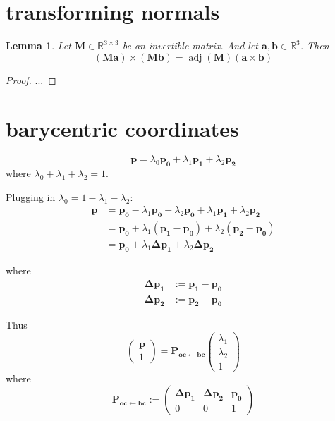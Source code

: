 \documentclass{article}
\newtheorem{lemma}{Lemma}
\newcommand{\R}{\mathbb{R}}
\newcommand{\vctr}[1]{\mathbf{#1}}
\newcommand{\point}[1]{\mathbf{#1}}
\newcommand{\mat}[1]{\mathbf{#1}}
\newcommand{\pMat}[2]{\mat{P_{#1 \leftarrow #2}}}
\newcommand{\colvec}[1]{\begin{pmatrix}#1\end{pmatrix}}
\DeclareMathOperator{\adj}{adj}
\begin{document}
\section{transforming normals}

\begin{lemma}
Let \(\mat{M} \in \R^{3\times 3}\) be an invertible matrix. And let \(\vctr{a}, \vctr{b} \in \R^3\). Then
\[
(\mat{M}\vctr{a})\times(\mat{M}\vctr{b}) = \adj(\mat{M}) (\vctr{a} \times \vctr{b})
\]
\end{lemma}
\begin{proof}
 ...
\end{proof}



\section{barycentric coordinates}

\[
\point{p} = \lambda_0 \point{p_0} + \lambda_1 \point{p_1} + \lambda_2 \point{p_2}
\]
where \(\lambda_0 + \lambda_1 + \lambda_2 = 1\).

Plugging in \(\lambda_0 = 1 - \lambda_1 - \lambda_2\):
\begin{align*}
\point{p} &= \point{p_0} - \lambda_1 \point{p_0} - \lambda_2 \point{p_0}  + \lambda_1 \point{p_1} + \lambda_2 \point{p_2} \\
&= \point{p_0}  + \lambda_1 (\point{p_1}-\point{p_0}) + \lambda_2 (\point{p_2} - \point{p_0})\\
&= \point{p_0} + \lambda_1 \point{\Delta p_1} + \lambda_2 \point{\Delta p_2}
\end{align*}

where
\begin{align*}
\point{\Delta p_1} &:= \point{p_1} - \point{p_0}\\
\point{\Delta p_2} &:= \point{p_2} - \point{p_0}
\end{align*}

Thus
\[
 \colvec{\point{p}\\1} = \pMat{oc}{bc} \colvec{\lambda_1 \\ \lambda_2 \\ 1}
\]
where
\begin{equation}
\label{eq:mat_oc_from_bc}
 \pMat{oc}{bc} := \begin{pmatrix} 
                  \point{\Delta p_1} & \point{\Delta p_2} & \point{p_0} \\
                  0 & 0 & 1
                 \end{pmatrix}
\end{equation}
\end{document}
